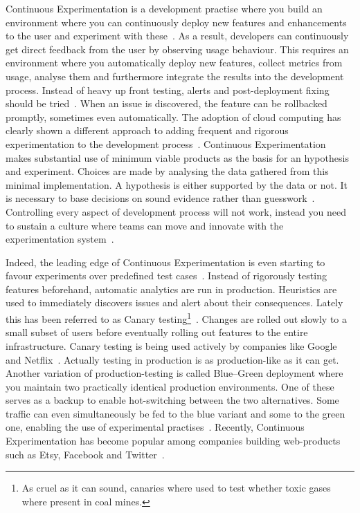 \documentclass[english]{tktltiki2}
\begin{document}
Continuous Experimentation is a development practise where you build an environment where you can continuously deploy new features and enhancements to the user and experiment with these~\cite{FGM14}. As a result, developers can continuously get direct feedback from the user by observing usage behaviour. This requires an environment where you automatically deploy new features, collect metrics from usage, analyse them and furthermore integrate the results into the development process. Instead of heavy up front testing, alerts and post-deployment fixing should be tried~\cite{FGM14}. When an issue is discovered, the feature can be rollbacked promptly, sometimes even automatically. The adoption of cloud computing has clearly shown a different approach to adding frequent and rigorous experimentation to the development process~\cite{Bos12}. Continuous Experimentation makes substantial use of minimum viable products as the basis for an hypothesis and experiment. Choices are made by analysing the data gathered from this minimal implementation. A hypothesis is either supported by the data or not. It is necessary to base decisions on sound evidence rather than guesswork~\cite{FGM14}. Controlling every aspect of development process will not work, instead you need to sustain a culture where teams can move and innovate with the experimentation system~\cite{Rie11}.

Indeed, the leading edge of Continuous Experimentation is even starting to favour experiments over predefined test cases~\cite{New15}. Instead of rigorously testing features beforehand, automatic analytics are run in production. Heuristics are used to immediately discovers issues and alert about their consequences. Lately this has been referred to as Canary testing\footnote{As cruel as it can sound, canaries where used to test whether toxic gases where present in coal mines.}~\cite{HF11, Sat14}. Changes are rolled out slowly to a small subset of users before eventually rolling out features to the entire infrastructure. Canary testing is being used actively by companies like Google and Netflix~\cite{Whi11, Sch13}. Actually testing in production is as production-like as it can get. Another variation of production-testing is called Blue–Green deployment where you maintain two practically identical production environments. One of these serves as a backup to enable hot-switching between the two alternatives. Some traffic can even simultaneously be fed to the blue variant and some to the green one, enabling the use of experimental practises~\cite{Fow10, HF11}. Recently, Continuous Experimentation has become popular among companies building web-products such as Etsy, Facebook and Twitter~\cite{McK12, Boh13, New13, Rho14, Wan14}.
\end{document}
